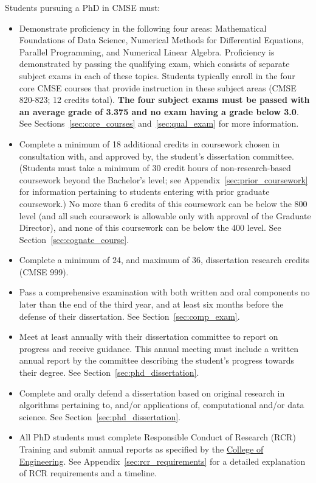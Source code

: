 Students pursuing a PhD in CMSE must:

\begin{itemize}
\item  Demonstrate proficiency in the following four areas:
  Mathematical Foundations of Data Science, Numerical Methods for
  Differential Equations, Parallel Programming, and Numerical Linear
  Algebra.  Proficiency is demonstrated by passing the qualifying
  exam, which consists of separate subject exams in each of these
  topics.  Students typically enroll in the four core CMSE courses
  that provide instruction in these subject areas (CMSE 820-823; 12
  credits total).  \textbf{The four subject exams must be passed with an
  average grade of 3.375 and no exam having a grade below 3.0}.  See
Sections~\ref{sec:core_courses} and~\ref{sec:qual_exam} for more information.

\item Complete a minimum of 18 additional credits in coursework
  chosen in consultation with, and approved by, the student's
  dissertation committee.  (Students must take a minimum of 30 credit
  hours of non-research-based coursework beyond the Bachelor's level;
  see Appendix~\ref{sec:prior_coursework} for information pertaining
  to students entering with prior graduate coursework.)
  No more than 6 credits of this coursework can be below the 800 level
  (and all such coursework is allowable only with approval of the
  Graduate Director), and none of this coursework can be below the 400
  level.  See Section~\ref{sec:cognate_course}.

\item Complete a minimum of 24, and maximum of 36, dissertation
  research credits (CMSE 999).

\item Pass a comprehensive examination with both written and oral
  components no later than the end of the third year, and at least six months before the defense of their
  dissertation.  See Section~\ref{sec:comp_exam}.

\item Meet at least annually with their dissertation committee to report on
  progress and receive guidance.  This annual meeting must include a
  written annual report by the committee describing the student's
  progress towards their degree.   See Section~\ref{sec:phd_dissertation}.

\item Complete and orally defend a dissertation based on original
  research in algorithms pertaining to, and/or applications of,
  computational and/or data science.  See Section~\ref{sec:phd_dissertation}.

\item All PhD students must complete Responsible Conduct of Research (RCR)
  Training and submit annual reports as specified by the
  \href{https://www.egr.msu.edu/academics/graduate/rcr}{College of
    Engineering}.  See Appendix~\ref{sec:rcr_requirements} for a
  detailed explanation of RCR requirements and a timeline.

\end{itemize}


